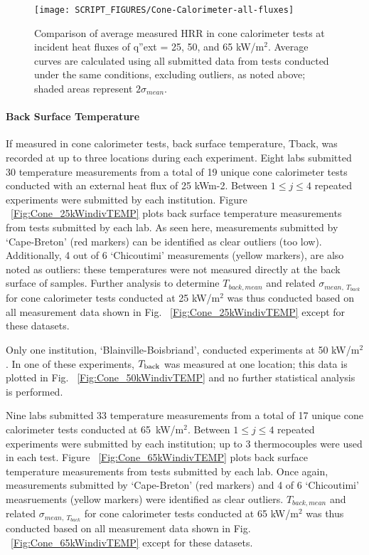 \documentclass{book}
\begin{document}
\begin{figure}
  \centering
  \texttt{[image: SCRIPT\_FIGURES/Cone-Calorimeter-all-fluxes]}
  \caption{Comparison of average measured HRR in cone calorimeter tests at incident heat fluxes of q”ext = 25, 50, and 65 kW/m$^2$. Average curves are calculated using all submitted data from tests conducted under the same conditions, excluding outliers, as noted above; shaded areas represent $2\sigma_{mean}$.}
  \label{Fig:Cone-Calorimeter-all-fluxes}
\end{figure}


\paragraph{Back Surface Temperature}

If measured in cone calorimeter tests, back surface temperature, Tback, was recorded at up to three locations during each experiment. Eight labs submitted 30 temperature measurements from a total of 19 unique cone calorimeter tests conducted with an external heat flux of 25 kWm-2. Between $1\le j\le4$ repeated experiments were submitted by each institution.  Figure ~\ref{Fig:Cone_25kWindivTEMP} plots back surface temperature measurements from tests submitted by each lab. As seen here, measurements submitted by ‘Cape-Breton’ (red markers) can be identified as clear outliers (too low). Additionally, 4 out of 6 ‘Chicoutimi’ measurements (yellow markers), are also noted as outliers: these temperatures were not measured directly at the back surface of samples. Further analysis to determine $T_{back,mean}$ and related $\sigma_{mean,\ T_{back}}$ for cone calorimeter tests conducted at 25 kW/m$^2$ was thus conducted based on all measurement data shown in Fig. ~\ref{Fig:Cone_25kWindivTEMP} except for these datasets.

Only one institution, ‘Blainville-Boisbriand’, conducted experiments at 50 kW/m$^2$. In one of these experiments, $T_{\rm back}$ was measured at one location; this data is plotted in Fig. ~\ref{Fig:Cone_50kWindivTEMP} and no further statistical analysis is performed.

Nine labs submitted 33 temperature measurements from a total of 17 unique cone calorimeter tests conducted at 65~kW/m$^2$. Between $1\le j\le4$ repeated experiments were submitted by each institution; up to 3 thermocouples were used in each test. Figure ~\ref{Fig:Cone_65kWindivTEMP} plots back surface temperature measurements from tests submitted by each lab. Once again, measurements  submitted by ‘Cape-Breton’ (red markers) and 4 of 6 ‘Chicoutimi’ measruements (yellow markers) were identified as clear outliers. $T_{back,mean}$ and related $\sigma_{mean,\ T_{back}}$ for cone calorimeter tests conducted at 65 kW/m$^2$ was thus conducted based on all measurement data shown in Fig. ~\ref{Fig:Cone_65kWindivTEMP} except for these datasets.
\end{document}

